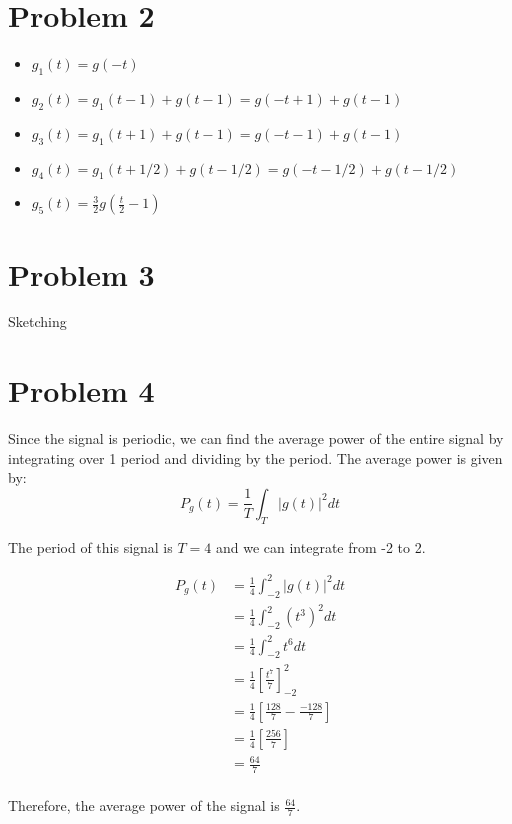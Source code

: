 \documentclass{article}
\begin{document}
\section{Problem 2}

\begin{itemize}
    \item $g_1(t) = g(-t)$
    \item $g_2(t) = g_1(t-1) + g(t-1) = g(-t+1) + g(t-1)$
    \item $g_3(t) = g_1(t+1) + g(t-1) = g(-t-1) + g(t-1)$
    \item $g_4(t) = g_1(t+1/2) + g(t-1/2) = g(-t-1/2) + g(t-1/2)$
    \item $g_5(t) = \frac{3}{2}g(\frac{t}{2}-1)$
\end{itemize}

\section{Problem 3}

Sketching 

\section{Problem 4}
Since the signal is periodic, we can find the average power of the entire signal by integrating over 1 period and dividing by the period. The average power is given by:
\[
    P_g(t) = \frac{1}{T} \int_{T} |g(t)|^2 dt
\]

The period of this signal is $T = 4$ and we can integrate from -2 to 2.

\begin{align*}
    P_g(t) &= \frac{1}{4} \int_{-2}^{2} |g(t)|^2 dt \\
    &= \frac{1}{4} \int_{-2}^{2} (t^3)^2 dt \\
    &= \frac{1}{4} \int_{-2}^{2} t^6 dt \\
    &= \frac{1}{4} \left[\frac{t^7}{7}\right]_{-2}^{2} \\
    &= \frac{1}{4} \left[\frac{128}{7} - \frac{-128}{7}\right] \\
    &= \frac{1}{4} \left[\frac{256}{7}\right] \\
    &= \boxed{\frac{64}{7}} \\
\end{align*}

Therefore, the average power of the signal is $\frac{64}{7}$.
\end{document}
